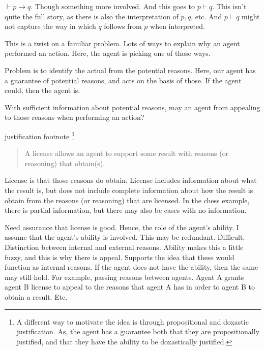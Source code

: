 \documentclass[10pt]{article}
\begin{document}
\begin{note}
  \(\vdash p \rightarrow q\).
  Though something more involved.
  And this goes to \(p \vdash q\).
  This isn't quite the full story, as there is also the interpretation of \(p, q\), etc.
  And \(p \vdash q\) might not capture the way in which \(q\) follows from \(p\) when interpreted.
\end{note}


\begin{note}
  This is a twist on a familiar problem.
  Lots of ways to explain why an agent performed an action.
  Here, the agent is picking one of those ways.

  Problem is to identify the actual from the potential reasons.
  Here, our agent has a guarantee of potential reasons, and acts on the basis of those.
  If the agent could, then the agent is.

  With sufficient information about potential reasons, may an agent from appealing to those reasons when performing an action?

  justification footnote\nolinebreak
  \footnote{
    A different way to motivate the idea is through propositional and doxastic justification.
    As, the agent has a guarantee both that they are propositionally justified, and that they have the ability to be doxastically justified.
  }
\end{note}


\begin{note}[License]

  \begin{quote}
    A license allows an agent to support some result with reasons (or reasoning) that obtain(s).
  \end{quote}
  License is that those reasons do obtain.
  License includes information about what the result is, but does not include complete information about how the result is obtain from the reasons (or reasoning) that are licensed.
  In the chess example, there is partial information, but there may also be cases with no information.

  Need assurance that license is good.
  Hence, the role of the agent's ability.
  I assume that the agent's ability is involved.
  This may be redundant.
  Difficult.
  Distinction between internal and external reasons.
  Ability makes this a little fuzzy, and this is why there is appeal.
  Supports the idea that these would function as internal reasons.
  If the agent does not have the ability, then the same may still hold.
  For example, passing reasons between agents.
  Agent A grants agent B license to appeal to the reasons that agent A has in order to agent B to obtain a result.
  Etc.
\end{note}
\end{document}
